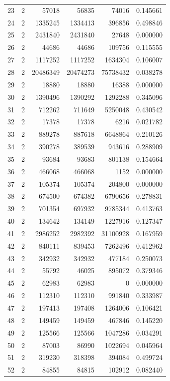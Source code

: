 \begin{longtable}{rrrrrr}
23 & 2 & 57018 & 56835 & 74016 & 0.145661\\
24 & 2 & 1335245 & 1334413 & 396856 & 0.498846\\
25 & 2 & 2431840 & 2431840 & 27648 & 0.000000\\
26 & 2 & 44686 & 44686 & 109756 & 0.115555\\
27 & 2 & 1117252 & 1117252 & 1634304 & 0.106007\\
28 & 2 & 20486349 & 20474273 & 75738432 & 0.038278\\
29 & 2 & 18880 & 18880 & 16388 & 0.000000\\
30 & 2 & 1390496 & 1390292 & 1292288 & 0.345096\\
31 & 2 & 712262 & 711649 & 5250048 & 0.430542\\
32 & 2 & 17378 & 17378 & 6216 & 0.021782\\
33 & 2 & 889278 & 887618 & 6648864 & 0.210126\\
34 & 2 & 390278 & 389539 & 943616 & 0.288909\\
35 & 2 & 93684 & 93683 & 801138 & 0.154664\\
36 & 2 & 466068 & 466068 & 1152 & 0.000000\\
37 & 2 & 105374 & 105374 & 204800 & 0.000000\\
38 & 2 & 674500 & 674382 & 6790656 & 0.278831\\
39 & 2 & 701354 & 697932 & 9785344 & 0.413763\\
40 & 2 & 134642 & 134149 & 1227916 & 0.127347\\
41 & 2 & 2986252 & 2982392 & 31100928 & 0.167959\\
42 & 2 & 840111 & 839453 & 7262496 & 0.412962\\
43 & 2 & 342932 & 342932 & 477184 & 0.250073\\
44 & 2 & 55792 & 46025 & 895072 & 0.379346\\
45 & 2 & 62983 & 62983 & 0 & 0.000000\\
46 & 2 & 112310 & 112310 & 991840 & 0.333987\\
47 & 2 & 197413 & 197408 & 1264006 & 0.106421\\
48 & 2 & 149459 & 149459 & 467846 & 0.145220\\
49 & 2 & 125566 & 125566 & 1047286 & 0.034291\\
50 & 2 & 87003 & 86990 & 1022694 & 0.045964\\
51 & 2 & 319230 & 318398 & 394084 & 0.499724\\
52 & 2 & 84855 & 84815 & 102912 & 0.082440\\

\end{longtable}
